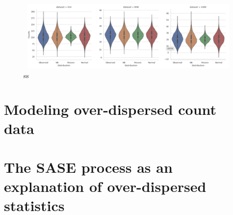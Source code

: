 \begin{figure}[htbp]
    \centering
    \includegraphics[width=1\linewidth]{images/violinplots_per_train.png}
    \caption{ss}
    \label{s}   
\end{figure}
\section{Modeling over-dispersed count data}

\section{The SASE process as an explanation of over-dispersed statistics}

